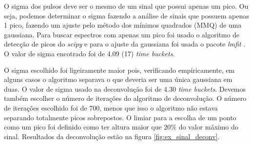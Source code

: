 \documentclass[a4paper,12pt,oneside]{book}
\begin{document}
\par O sigma dos pulsos deve ser o mesmo de um sinal que possui apenas um pico. Ou seja, podemos determinar o sigma fazendo a análise de sinais que possuem apenas 1 pico, fazendo um ajuste pelo método dos mínimos quadrados (MMQ) de uma gaussiana. Para buscar espectros com apenas um pico foi usado o algoritmo de detecção de picos do \textit{scipy}\cite{scipy} e para o ajuste da gaussiana foi usada o pacote \textit{lmfit} \cite{lmfit}. O valor de sigma encotrado foi de 4.09 (17) \textit{time buckets}.

\par O sigma escolhido foi ligeiramente maior pois, verificando empiricamente, em alguns casos o algoritmo separava o que deveria ser uma única gaussiana em duas. O valor de sigma usado na deconvolução foi de 4.30 \textit{time buckets}. Devemos também escolher o número de iterações do algoritmo de deconvolução. O número de iterações escolhido foi de 700, menos que isso o algoritmo não estava separando totalmente picos sobrepostos. O limiar para a escolha de um ponto como um pico foi definido como ter altura maior que 20\% do valor máximo do sinal. Resultados da deconvolução estão na figura \ref{fig:ex_sinal_deconv}.
\end{document}
